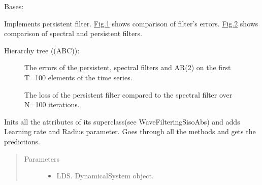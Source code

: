 \documentclass[letterpaper,10pt,english]{sphinxmanual}
\begin{document}
\begin{fulllineitems}
\label{\detokenize{LDS.LDS.filters:LDS.LDS.filters.wave_filtering_siso_persistent.WaveFilteringSISOPersistent}}
\sphinxAtStartPar
Bases: {\hyperref[\detokenize{LDS.LDS.filters:LDS.LDS.filters.wave_filtering_siso_abs.WaveFilteringSisoAbs}]{}}

\sphinxAtStartPar
Implements persistent filter. \hyperref[\detokenize{LDS.LDS.filters:persistent}]{Fig.\@ \ref{\detokenize{LDS.LDS.filters:persistent}}} shows comparison of filter’s errors.
\hyperref[\detokenize{LDS.LDS.filters:loss}]{Fig.\@ \ref{\detokenize{LDS.LDS.filters:loss}}} shows comparison of spectral and persistent filters.

\sphinxAtStartPar
Hierarchy tree ((ABC)):

\noindent{}

\begin{figure}[htbp]
\centering
\capstart

\noindent{}
\caption{The errors of the persistent, spectral filters and AR(2) on the first T=100 elements of the
time series.}\label{\detokenize{LDS.LDS.filters:id3}}\label{\detokenize{LDS.LDS.filters:persistent}}\end{figure}

\begin{figure}[htbp]
\centering
\capstart

\noindent{}
\caption{The loss of the persistent filter compared to the spectral filter over N=100 iterations.}\label{\detokenize{LDS.LDS.filters:id4}}\label{\detokenize{LDS.LDS.filters:loss}}\end{figure}

\sphinxAtStartPar
Inits all the attributes of its superclass(see WaveFilteringSisoAbs) and
adds Learning rate and Radius parameter.
Goes through all the methods and gets the predictions.
\begin{quote}\begin{description}
\item[{Parameters}] \leavevmode\begin{itemize}
\item {} 
\sphinxAtStartPar
{} \textendash{} LDS. DynamicalSystem object.


\end{itemize}
\end{description}
\end{quote}
\end{fulllineitems}
\end{document}
